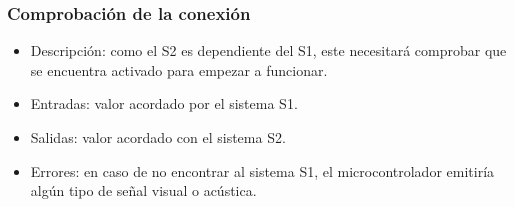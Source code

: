 \subsubsection{Comprobación de la conexión}
\begin{itemize}
    \item Descripción: como el \ac{S2} es dependiente del \ac{S1}, este necesitará comprobar que se encuentra activado para empezar a funcionar.
    \item Entradas: valor acordado por el sistema \ac{S1}.
    \item Salidas: valor acordado con el sistema \ac{S2}.
    \item Errores: en caso de no encontrar al sistema \ac{S1}, el microcontrolador emitiría algún tipo de señal visual o acústica.
\end{itemize}